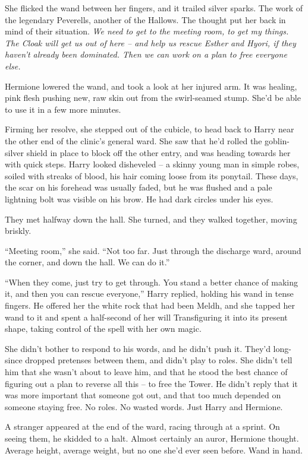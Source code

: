 She flicked the wand between her fingers, and it trailed silver sparks.
The work of the legendary Peverells, another of the Hallows. The thought
put her back in mind of their situation. \emph{We need to get to the
meeting room, to get my things. The Cloak will get us out of here -- and
help us rescue Esther and Hyori, if they haven't already been dominated.
Then we can work on a plan to free everyone else.}

Hermione lowered the wand, and took a look at her injured arm. It was
healing, pink flesh pushing new, raw skin out from the swirl-seamed
stump. She'd be able to use it in a few more minutes.

Firming her resolve, she stepped out of the cubicle, to head back to
Harry near the other end of the clinic's general ward. She saw that he'd
rolled the goblin-silver shield in place to block off the other entry,
and was heading towards her with quick steps. Harry looked disheveled --
a skinny young man in simple robes, soiled with streaks of blood, his
hair coming loose from its ponytail. These days, the scar on his
forehead was usually faded, but he was flushed and a pale lightning bolt
was visible on his brow. He had dark circles under his eyes.

They met halfway down the hall. She turned, and they walked together,
moving briskly.

``Meeting room,'' she said. ``Not too far. Just through the discharge
ward, around the corner, and down the hall. We can do it.''

``When they come, just try to get through. You stand a better chance of
making it, and then you can rescue everyone,'' Harry replied, holding
his wand in tense fingers. He offered her the white rock that had been
Meldh, and she tapped her wand to it and spent a half-second of her will
Transfiguring it into its present shape, taking control of the spell
with her own magic.

She didn't bother to respond to his words, and he didn't push it. They'd
long-since dropped pretenses between them, and didn't play to roles. She
didn't tell him that she wasn't about to leave him, and that he stood
the best chance of figuring out a plan to reverse all this -- to free
the Tower. He didn't reply that it was more important that someone got
out, and that too much depended on someone staying free. No roles. No
wasted words. Just Harry and Hermione.

A stranger appeared at the end of the ward, racing through at a sprint.
On seeing them, he skidded to a halt. Almost certainly an auror,
Hermione thought. Average height, average weight, but no one she'd ever
seen before. Wand in hand.

